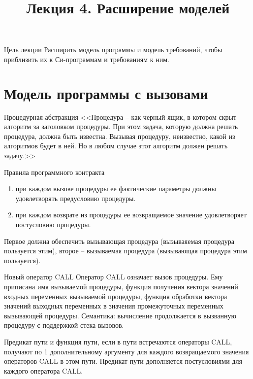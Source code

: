 \documentclass[hyperref={unicode=true}]{beamer}
\title{Лекция 4. Расширение моделей}
\author{}
\date{}
\begin{document}
	\begin{frame}{}
		\titlepage
	\end{frame}

    \begin{frame}{Цель лекции}
    Расширить модель программы и модель требований, чтобы приблизить их к Си-программам и требованиям к ним.
    \end{frame}

    \section{Модель программы с вызовами}

    \begin{frame}{Процедурная абстракция}
    <<Процедура -- как черный ящик, в котором скрыт алгоритм за заголовком процедуры. При этом задача, которую должна решать процедура, должна быть известна. Вызывая процедуру, неизвестно, какой из алгоритмов будет в ней. Но в любом случае этот алгоритм должен решать задачу.>>
    \end{frame}

    \begin{frame}{Правила программного контракта}
    \begin{enumerate}
    \item при каждом вызове процедуры ее фактические параметры должны удовлетворять предусловию процедуры.
    \item при каждом возврате из процедуры ее возвращаемое значение удовлетворяет постусловию процедуры.
    \end{enumerate}

    Первое должна обеспечить вызывающая процедура (вызываяемая процедура пользуется этим), второе -- вызываемая процедура (вызывающая процедура этим пользуется).
    \end{frame}

    \begin{frame}{Новый оператор CALL}
    Оператор CALL означает вызов процедуры. Ему приписана имя вызываемой процедуры, функция получения вектора значений входных переменных вызываемой процедуры, функция обработки вектора значений выходных переменных в значения промежуточных переменных вызывающей процедуры. Семантика: вычисление продолжается в вызванную процедуру с поддержкой стека вызовов.

    Предикат пути и функция пути, если в пути встречаются операторы CALL, получают по 1 дополнительному аргументу для каждого возвращаемого значения операторов CALL в этом пути. Предикат пути дополняется постусловиями для каждого оператора CALL.
    \end{frame}
\end{document}
